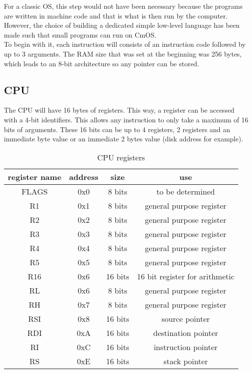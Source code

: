 \documentclass[a4paper,12pt]{article}
\begin{document}
For a classic OS, this step would not have been necessary because the programs are written in machine code and that is what is then run by the computer. However, the choice of building a dedicated simple low-level language has been made such that small programs can run on CmOS.\\
To begin with it, each instruction will consists of an instruction code followed by up to 3 arguments. The RAM size that was set at the beginning was 256 bytes, which leads to an 8-bit architecture so any pointer can be stored.

\subsection{CPU}

The CPU will have 16 bytes of registers. This way, a register can be accessed with a 4-bit identifiers. This allows any instruction to only take a maximum of 16 bits of arguments. These 16 bits can be up to 4 registers, 2 registers and an immediate byte value or an immediate 2 bytes value (disk address for example).

\begin{table}[H]
    \centering
    \begin{tabular}{|c|c|c|c|}
        \hline
        register name & address  & size & use \\ 
        \hline
        FLAGS  & 0x0 & 8 bits  & to be determined \\
        R1     & 0x1 & 8 bits  & general purpose register \\
        R2     & 0x2 & 8 bits  & general purpose register \\
        R3     & 0x3 & 8 bits  & general purpose register \\
        R4     & 0x4 & 8 bits  & general purpose register \\
        R5     & 0x5 & 8 bits  & general purpose register \\
        R16    & 0x6 & 16 bits & 16 bit register for arithmetic \\
        RL     & 0x6 & 8 bits  & general purpose register \\
        RH     & 0x7 & 8 bits  & general purpose register \\
        RSI    & 0x8 & 16 bits & source pointer \\
        RDI    & 0xA & 16 bits & destination pointer \\
        RI     & 0xC & 16 bits & instruction pointer \\
        RS     & 0xE & 16 bits & stack pointer \\
        \hline
    \end{tabular}
    \caption{CPU registers}
    \label{tab:CPU registers}
\end{table}
\end{document}
